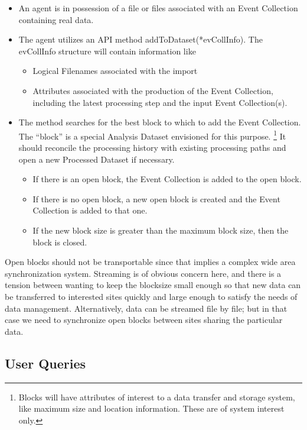 \documentclass{cmspaper}
\begin{document}
\begin{itemize}
\item An agent is in possession of a file or files associated with an Event Collection
containing real data.
\item The agent utilizes an API method addToDataset(*evCollInfo).  The evCollInfo structure 
will contain information like 
\begin{itemize}
\item Logical Filenames associated with the import
\item Attributes associated with the production of the Event Collection, 
including the latest processing step and the input Event Collection(s). 
\end{itemize}
\item The method searches for the best block to which to add the Event Collection.  
The ``block'' is a special Analysis Dataset envisioned for this purpose.  
\footnote{Blocks will have attributes of interest to a data transfer and storage 
system, like maximum size and location information. These are of system interest only.}
It should reconcile the processing history with existing processing paths and 
open a new Processed Dataset if necessary.
\begin{itemize}
\item If there is an open block, the Event Collection is added to the open block.
\item If there is no open block, a new open block is created and the Event Collection is added to that one.
\item If the new block size is greater than the maximum block size, then the block is closed.  
\end{itemize}
\end{itemize}

Open blocks should not be transportable since that implies a complex wide area synchronization 
system. Streaming is of obvious concern here, and there is a tension between wanting to keep 
the blocksize small enough so that 
new data can be transferred to interested sites quickly and large enough to satisfy 
the needs of data management.
Alternatively, data can be streamed file by file; but in that case we need to synchronize
open blocks between sites sharing the particular data.

\subsection{User Queries}
\end{document}
